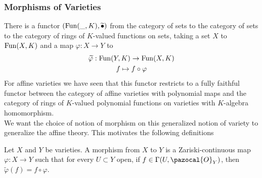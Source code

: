     \subsubsection{Morphisms of Varieties}
    There is a functor $(\mathrm{Fun}(\_,K),\widetilde{\bullet})$ from the category of sets to the category of sets to the category of rings of $K$-valued functions on sets, taking a set $X$ to $\mathrm{Fun}(X,K)$ and a map $\varphi : X\rightarrow Y$ to 
    \begin{gather*}
        \widetilde{\varphi}: \mathrm{Fun}(Y,K)\rightarrow \mathrm{Fun}(X,K)\\
        f\mapsto f\circ \varphi
    \end{gather*}
    For affine varieties we have seen that this functor restricts to a fully faithful functor between the category of affine varieties with polynomial maps and the category of rings of $K$-valued polynomial functions on varieties with $K$-algebra homomorphism.\\
    We want the choice of notion of morphism on this generalized notion of variety to generalize the affine theory. This motivates the following definitions 
    \begin{definition}
        Let $X$ and $Y$ be varieties. A morphism from $X$ to $Y$ is a Zariski-continuous map $\varphi: X\rightarrow Y$ such that for every $U\subset Y$ open, if $f\in \Gamma(U,\pazocal{O}_Y)$, then $\widetilde{\varphi}(f)=f\circ \varphi$. 
    \end{definition}
